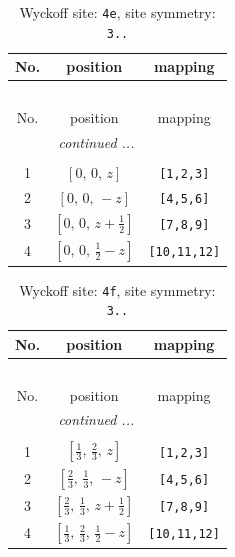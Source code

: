 \documentclass[fleqn,8pt]{jsarticle}
\begin{document}
\begin{longtable}{ccc}
\caption{Wyckoff site: {\tt 4e}, site symmetry: {\tt 3..}}
 \\
 \hline \hline
No. & position & mapping \\ \hline \endfirsthead

\multicolumn{2}{l}{\tablename\ \thetable{}} \\
 \hline \hline
No. & position & mapping \\ \hline \endhead

 \hline \hline
\multicolumn{2}{r}{\footnotesize\it continued ...} \\ \endfoot

 \hline \hline
\multicolumn{2}{r}{} \\ \endlastfoot

1 & $\left[ 0,\, 0,\, z \right]$ & {\tt [1,2,3]} \\ \hline
2 & $\left[ 0,\, 0,\, - z \right]$ & {\tt [4,5,6]} \\ \hline
3 & $\left[ 0,\, 0,\, z + \frac{1}{2} \right]$ & {\tt [7,8,9]} \\ \hline
4 & $\left[ 0,\, 0,\, \frac{1}{2} - z \right]$ & {\tt [10,11,12]} \\
\end{longtable}
\renewcommand{\arraystretch}{1.2}
\begin{longtable}{ccc}
\caption{Wyckoff site: {\tt 4f}, site symmetry: {\tt 3..}}
 \\
 \hline \hline
No. & position & mapping \\ \hline \endfirsthead

\multicolumn{2}{l}{\tablename\ \thetable{}} \\
 \hline \hline
No. & position & mapping \\ \hline \endhead

 \hline \hline
\multicolumn{2}{r}{\footnotesize\it continued ...} \\ \endfoot

 \hline \hline
\multicolumn{2}{r}{} \\ \endlastfoot

1 & $\left[ \frac{1}{3},\, \frac{2}{3},\, z \right]$ & {\tt [1,2,3]} \\ \hline
2 & $\left[ \frac{2}{3},\, \frac{1}{3},\, - z \right]$ & {\tt [4,5,6]} \\ \hline
3 & $\left[ \frac{2}{3},\, \frac{1}{3},\, z + \frac{1}{2} \right]$ & {\tt [7,8,9]} \\ \hline
4 & $\left[ \frac{1}{3},\, \frac{2}{3},\, \frac{1}{2} - z \right]$ & {\tt [10,11,12]} \\
\end{longtable}
\end{document}
